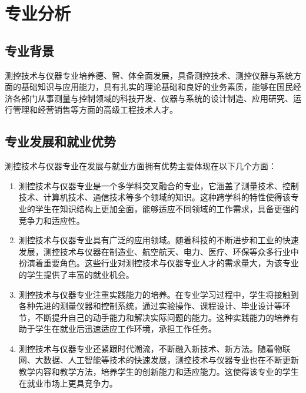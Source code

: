\documentclass{ctexart}
\begin{document}
	\section{专业分析}
		\subsection{专业背景}
			测控技术与仪器专业培养德、智、体全面发展，具备测控技术、测控仪器与系统方面的基础知识与应用能力，具有扎实的理论基础和良好的业务素质，能够在国民经济各部门从事测量与控制领域的科技开发、仪器与系统的设计制造、应用研究、运行管理和经营销售等方面的高级工程技术人才。
		\subsection{专业发展和就业优势}
			测控技术与仪器专业在发展与就业方面拥有优势主要体现在以下几个方面：
			\begin{enumerate}
				\item 测控技术与仪器专业是一个多学科交叉融合的专业，它涵盖了测量技术、控制技术、计算机技术、通信技术等多个领域的知识。这种跨学科的特性使得该专业的学生在知识结构上更加全面，能够适应不同领域的工作需求，具备更强的竞争力和适应性。
				\item 测控技术与仪器专业具有广泛的应用领域。随着科技的不断进步和工业的快速发展，测控技术与仪器在制造业、航空航天、电力、医疗、环保等众多行业中扮演着重要角色。这些行业对测控技术与仪器专业人才的需求量大，为该专业的学生提供了丰富的就业机会。
				\item 测控技术与仪器专业注重实践能力的培养。在专业学习过程中，学生将接触到各种先进的测量仪器和控制系统，通过实验操作、课程设计、毕业设计等环节，不断提升自己的动手能力和解决实际问题的能力。这种实践能力的培养有助于学生在就业后迅速适应工作环境，承担工作任务。
				\item 测控技术与仪器专业还紧跟时代潮流，不断融入新技术、新方法。随着物联网、大数据、人工智能等技术的快速发展，测控技术与仪器专业也在不断更新教学内容和教学方法，培养学生的创新能力和适应能力。这使得该专业的学生在就业市场上更具竞争力。
			\end{enumerate}
\end{document}
